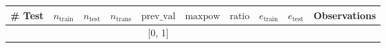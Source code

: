 \documentclass[conference,final,]{IEEEtran}
\begin{document}
\begin{longtable*}[]{@{}cccccccccl@{}}
\toprule
\begin{minipage}[b]{0.02\columnwidth}\centering
\# Test\strut
\end{minipage} & \begin{minipage}[b]{0.06\columnwidth}\centering
\(n_\text{train}\)\strut
\end{minipage} & \begin{minipage}[b]{0.07\columnwidth}\centering
\(n_{\text{test}}\)\strut
\end{minipage} & \begin{minipage}[b]{0.06\columnwidth}\centering
\(n_\text{trans}\)\strut
\end{minipage} & \begin{minipage}[b]{0.07\columnwidth}\centering
\(\text{prev_val}\)\strut
\end{minipage} & \begin{minipage}[b]{0.06\columnwidth}\centering
\(\text{maxpow}\)\strut
\end{minipage} & \begin{minipage}[b]{0.05\columnwidth}\centering
\(\text{ratio}\)\strut
\end{minipage} & \begin{minipage}[b]{0.06\columnwidth}\centering
\(e_\text{train}\)\strut
\end{minipage} & \begin{minipage}[b]{0.06\columnwidth}\centering
\(e_\text{test}\)\strut
\end{minipage} & \begin{minipage}[b]{0.23\columnwidth}\raggedright
Observations\strut
\end{minipage}\tabularnewline
\midrule
\endhead
\begin{minipage}[t]{0.02\columnwidth}\strut
\end{minipage} & \begin{minipage}[t]{0.06\columnwidth}\strut
\end{minipage} & \begin{minipage}[t]{0.07\columnwidth}\strut
\end{minipage} & \begin{minipage}[t]{0.06\columnwidth}\strut
\end{minipage} & \begin{minipage}[t]{0.07\columnwidth}\centering
{[}0, 1{]}\strut
\end{minipage} & \begin{minipage}[t]{0.06\columnwidth}\centering

\end{minipage}
\end{longtable*}
\end{document}
